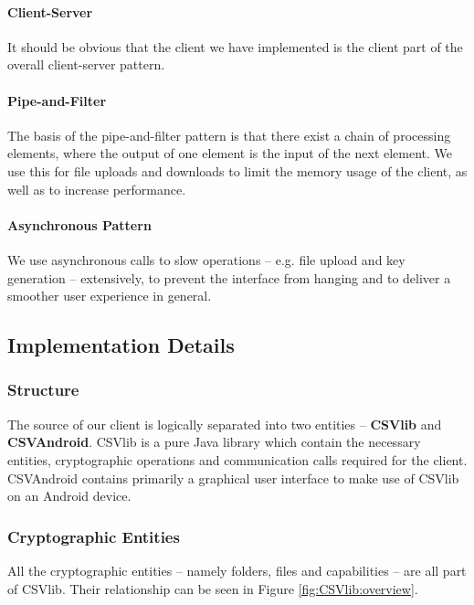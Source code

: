 \documentclass[pdftex,english,10pt,b5paper,twoside]{book}
\begin{document}
\paragraph{Client-Server} It should be obvious that the client we have
implemented is the client part of the overall client-server pattern.

\paragraph{Pipe-and-Filter} The basis of the pipe-and-filter pattern is that
there exist a chain of processing elements, where the output of one element is
the input of the next element. We use this for file uploads and downloads to
limit the memory usage of the client, as well as to increase performance.

\paragraph{Asynchronous Pattern} We use asynchronous calls to slow operations
-- e.g. file upload and key generation -- extensively, to prevent the interface
from hanging and to deliver a smoother user experience in general.

\subsection{Implementation Details}
\label{sec:cli:impl:det}

\subsubsection{Structure}

The source of our client is logically separated into two entities --
\textbf{CSVlib} and \textbf{CSVAndroid}. CSVlib is a pure Java library which
contain the necessary entities, cryptographic operations and communication
calls required for the client. CSVAndroid contains primarily a graphical user
interface to make use of CSVlib on an Android device.

\subsubsection{Cryptographic Entities}
\label{sec:cryptoentities}
All the cryptographic entities -- namely folders, files and capabilities -- are all
part of CSVlib. Their relationship can be seen in Figure \ref{fig:CSVlib:overview}.
\end{document}
